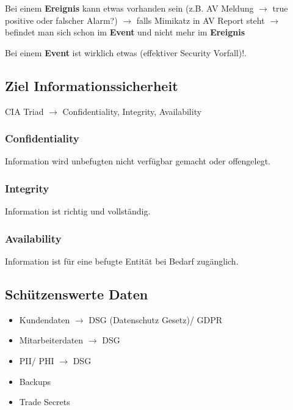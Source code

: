 Bei einem \textbf{\textcolor{OSTPink}{Ereignis}} kann etwas vorhanden sein (z.B. AV Meldung $\rightarrow$ true positive oder falscher Alarm?) $\rightarrow$ falls Mimikatz in AV Report steht $\rightarrow$ befindet man sich schon im \textbf{\textcolor{OSTPink}{Event}} und nicht mehr im \textbf{Ereignis}

Bei einem \textbf{\textcolor{OSTPink}{Event}} ist wirklich etwas (effektiver Security Vorfall)!.

\subsection{Ziel Informationssicherheit}
CIA Triad $\rightarrow$ Confidentiality, Integrity, Availability

\subsubsection{Confidentiality}
Information wird unbefugten nicht verfügbar gemacht oder offengelegt.

\subsubsection{Integrity}
Information ist richtig und vollständig.

\subsubsection{Availability}
Information ist für eine befugte Entität bei Bedarf zugänglich.

\subsection{Schützenswerte Daten}
\begin{itemize}
    \item Kundendaten $\rightarrow$ DSG (Datenschutz Gesetz)/ GDPR
    \item Mitarbeiterdaten $\rightarrow$ DSG
    \item PII/ PHI $\rightarrow$ DSG
    \item Backups
    \item Trade Secrets
\end{itemize}

